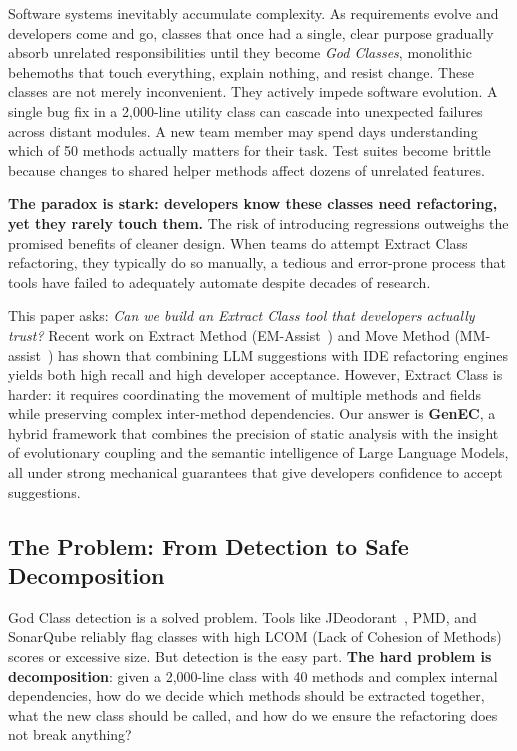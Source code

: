 \documentclass[sigconf]{acmart}
\begin{document}
Software systems inevitably accumulate complexity.  As requirements evolve and
developers come and go, classes that once had a single, clear purpose gradually
absorb unrelated responsibilities until they become \emph{God Classes}, monolithic
behemoths that touch everything, explain nothing, and resist change. These
classes are not merely inconvenient. They actively impede software evolution. A
single bug fix in a 2,000-line utility class can cascade into unexpected
failures across distant modules. A new team member may spend days understanding
which of 50 methods actually matters for their task. Test suites become brittle
because changes to shared helper methods affect dozens of unrelated features.

\textbf{The paradox is stark: developers know these classes need refactoring,
yet they rarely touch them.}  The risk of introducing regressions outweighs the
promised benefits of cleaner design. When teams do attempt Extract Class
refactoring, they typically do so manually, a tedious and error-prone process that
tools have failed to adequately automate despite decades of research.

This paper asks: \emph{Can we build an Extract Class tool that developers
actually trust?}  Recent work on Extract Method
(EM-Assist~\cite{Pomian2024EMAssist}) and Move Method
(MM-assist~\cite{Xu2025MoveMethod}) has shown that combining LLM
suggestions with IDE refactoring engines yields both high recall and high
developer acceptance. However, Extract Class is harder: it
requires coordinating the movement of multiple methods and fields while
preserving complex inter-method dependencies. Our answer is \textbf{GenEC}, a
hybrid framework that combines the precision of static analysis with the insight
of evolutionary coupling and the semantic intelligence of Large Language
Models, all under strong mechanical guarantees that give developers confidence
to accept suggestions.

\subsection{The Problem: From Detection to Safe Decomposition}
\label{sec:problem}

God Class detection is a solved problem. Tools like
JDeodorant~\cite{Fokaefs2011JDeodorant}, PMD, and SonarQube reliably flag
classes with high LCOM (Lack of Cohesion of Methods) scores or excessive size.
But detection is the easy part. \textbf{The hard problem is decomposition}:
given a 2,000-line class with 40 methods and complex internal dependencies, how
do we decide which methods should be extracted together, what the new class
should be called, and how do we ensure the refactoring does not
break anything?
\end{document}
